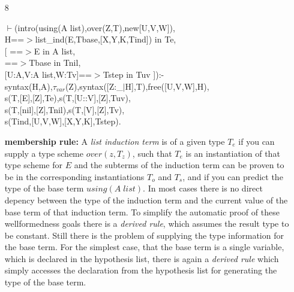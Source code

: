 \documentclass[11pt]{report}
\begin{document}
\begin{enumerate}
 \item[8]
\begin{sf}\begin{tabbing}
$\vdash$(intro(using(A list),over(Z,T),new[U,V,W]),\\[-0.15ex]
\hspace{2em}H==$>$list\_\hspace{0.1em}ind(E,Tbase,[X,Y,K,Tind]) in Te,\\[-0.15ex]
\hspace{2em}[ ==$>$E in A list, \\[-0.15ex]
\hspace{3em}==$>$Tbase in Tnil, \\[-0.15ex]
\hspace{3em}[U:A,V:A list,W:Tv]==$>$Tstep in Tuv ]):-\\[-0.15ex]
\hspace{2em}syntax(H,A),$\tau_{var}$(Z),syntax([Z:\_\hspace{0.1em}$\mid$H],T),free([U,V,W],H),\\[-0.15ex]
\hspace{2em}s(T,[E],[Z],Te),s(T,[U::V],[Z],Tuv),\\[-0.15ex]
\hspace{2em}s(T,[nil],[Z],Tnil),s(T,[V],[Z],Tv),\\[-0.15ex]
\hspace{2em}s(Tind,[U,V,W],[X,Y,K],Tstep).
\end{tabbing}\end{sf}

 {\bf membership rule:}
 A \emph{list induction term} is of a given type $T_e$ if you can
 supply a type scheme $over(z,T_z)$, such that $T_e$ is an
 instantiation of that type scheme for $E$ and the subterms of
 the induction term can be proven to be in the corresponding
 instantiations $T_o$ and $T_s$, and if you can predict the
 type of the base term $using(A\; list)$. 
 In most cases there is no direct
 depency between the type of the induction term and the current
 value of the base term of that induction term. To simplify
 the automatic proof of these wellformedness goals there is
 a \emph{derived rule}, which assumes the result type to be constant.
 Still there is the problem of
 supplying the type information for the base term. For the
 simplest case, that the base term is a single variable, which
 is declared in the hypothesis list, there is again a \emph{derived 
 rule} which simply accesses the declaration from the hypothesis
 list for generating the type of the base term.
 

\end{enumerate}
\end{document}
